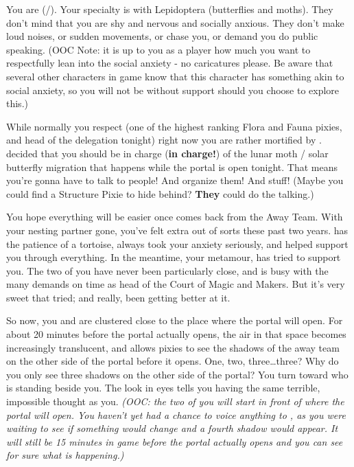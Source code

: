 \documentclass[char]{PP}
\begin{document}
\name{\cFButterfly{}}

You are \cFButterfly{} (\cFButterfly{\They}/\cFButterfly{\Them}). Your specialty is with Lepidoptera (butterflies and moths). They don’t mind that you are shy and nervous and socially anxious. They don’t make loud noises, or sudden movements, or chase you, or demand you do public speaking. (OOC Note: it is up to you as a player how much you want to respectfully lean into the social anxiety - no caricatures please. Be aware that several other characters in game know that this character has something akin to social anxiety, so you will not be without support should you choose to explore this.)

While normally you respect \cFHead{} (one of the highest ranking Flora and Fauna pixies, and head of the delegation tonight) right now you are rather mortified by \cFHead{\them}. \cFHead{} decided that you should be in charge (\textbf{in charge!}) of the lunar moth / solar butterfly migration that happens while the portal is open tonight. That means you’re gonna have to talk to people! And organize them! And stuff! (Maybe you could find a Structure Pixie to hide behind? \textbf{They} could do the talking.)

You hope everything will be easier once \cFLost{} comes back from the Away Team. With your nesting partner gone, you’ve felt extra out of sorts these past two years. \cFLost{} has the patience of a tortoise, always took your anxiety seriously, and helped support you through everything. In the meantime, your metamour, \cMHead{} has tried to support you. The two of you have never been particularly close, and \cMHead{} is busy with the many demands on \cMHead{\their} time as head of the Court of Magic and Makers. But it’s very sweet that \cMHead{\they} \cMHead{\have} tried; and really, \cMHead{\they} \cMHead{\have} been getting better at it.

So now, you and \cMHead{} are clustered close to the place where the portal will open. For about 20 minutes before the portal actually opens, the air in that space becomes increasingly translucent, and allows pixies to see the shadows of the away team on the other side of the portal before it opens. One, two, three\ldots three? Why do you only see three shadows on the other side of the portal?  You turn toward \cMHead{} who is standing beside you. The look in \cMHead{\their} eyes tells you \cMHead{\theyare} having the same terrible, impossible thought as you. \textit{(OOC: the two of you will start in front of where the portal will open. You haven’t yet had a chance to voice anything to \cFButterfly{}, as you were waiting to see if something would change and a fourth shadow would appear. It will still be 15 minutes in game before the portal actually opens and you can see for sure what is happening.)}
\end{document}
